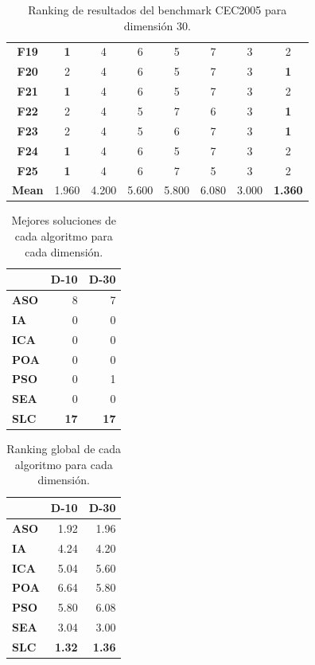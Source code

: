 \begin{table}
\begin{tabular}{cccccccc}
		\textbf{F19}  &      \textbf{1} &      4 &      6 &      5 &      7 &      3 &      2 \\
		\textbf{F20}  &      2 &      4 &      6 &      5 &      7 &      3 &      \textbf{1} \\
		\textbf{F21}  &      \textbf{1} &      4 &      6 &      5 &      7 &      3 &      2 \\
		\textbf{F22}  &      2 &      4 &      5 &      7 &      6 &      3 &      \textbf{1} \\
		\textbf{F23}  &      2 &      4 &      5 &      6 &      7 &      3 &      \textbf{1} \\
		\textbf{F24}  &      \textbf{1} &      4 &      6 &      5 &      7 &      3 &      2 \\
		\textbf{F25}  &      \textbf{1} &      4 &      6 &      7 &      5 &      3 &      2 \\
		\textbf{Mean} &  1.960 &  4.200 &  5.600 &  5.800 &  6.080 &  3.000 &  \textbf{1.360} \\
		\bottomrule
	\end{tabular}
	\caption{Ranking de resultados del benchmark CEC2005 para dimensión 30.}
\end{table}

\begin{table}
	\centering
	\begin{tabular}{lrr}
		\toprule
		{} &  \textbf{D-10} &  \textbf{D-30} \\
		\midrule
		\textbf{ASO} &   8 &   7 \\
		\textbf{IA}  &   0 &   0 \\
		\textbf{ICA} &   0 &   0 \\
		\textbf{POA} &   0 &   0 \\
		\textbf{PSO} &   0 &   1 \\
		\textbf{SEA} &   0 &   0 \\
		\textbf{SLC} &  \textbf{17} &  \textbf{17} \\
		\bottomrule
	\end{tabular}
	\caption{Mejores soluciones de cada algoritmo para cada dimensión.}
\end{table}

\begin{table}
	\centering
	\begin{tabular}{lrr}
		\toprule
		{} &    \textbf{D-10} &    \textbf{D-30} \\
		\midrule
		\textbf{ASO} &  1.92 &  1.96 \\
		\textbf{IA}  &  4.24 &  4.20 \\
		\textbf{ICA} &  5.04 &  5.60 \\
		\textbf{POA} &  6.64 &  5.80 \\
		\textbf{PSO} &  5.80 &  6.08 \\
		\textbf{SEA} &  3.04 &  3.00 \\
		\textbf{SLC} &  \textbf{1.32} &  \textbf{1.36} \\
		\bottomrule
	\end{tabular}
	\caption{Ranking global de cada algoritmo para cada dimensión.}
\end{table}

